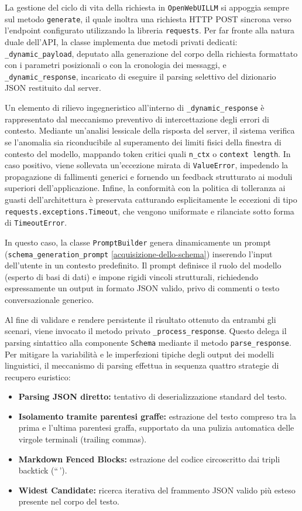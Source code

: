 La gestione del ciclo di vita della richiesta in \texttt{OpenWebUILLM}
si appoggia sempre sul metodo \texttt{generate}, il quale inoltra una
richiesta HTTP POST sincrona verso l'endpoint configurato utilizzando la
libreria \texttt{requests}. Per far fronte alla natura duale dell'API,
la classe implementa due metodi privati dedicati:
\texttt{\_dynamic\_payload}, deputato alla generazione del corpo della
richiesta formattato con i parametri posizionali o con la cronologia dei
messaggi, e \texttt{\_dynamic\_response}, incaricato di eseguire il
parsing selettivo del dizionario JSON restituito dal server.

Un elemento di rilievo ingegneristico all'interno di
\texttt{\_dynamic\_response} è rappresentato dal meccanismo preventivo
di intercettazione degli errori di contesto. Mediante un'analisi
lessicale della risposta del server, il sistema verifica se l'anomalia
sia riconducibile al superamento dei limiti fisici della finestra di
contesto del modello, mappando token critici quali \texttt{n\_ctx} o
\texttt{context\ length}. In caso positivo, viene sollevata un'eccezione
mirata di \texttt{ValueError}, impedendo la propagazione di fallimenti
generici e fornendo un feedback strutturato ai moduli superiori
dell'applicazione. Infine, la conformità con la politica di tolleranza
ai guasti dell'architettura è preservata catturando esplicitamente le
eccezioni di tipo \texttt{requests.exceptions.Timeout}, che vengono
uniformate e rilanciate sotto forma di \texttt{TimeoutError}.

In questo caso, la classe \texttt{PromptBuilder} genera dinamicamente un
prompt (\texttt{schema\_generation\_prompt} \ref{acquisizione-dello-schema}) inserendo l'input
dell'utente in un contesto predefinito. Il prompt definisce il ruolo del
modello (esperto di basi di dati) e impone rigidi vincoli strutturali,
richiedendo espressamente un output in formato JSON valido, privo di
commenti o testo conversazionale generico.

Al fine di validare e rendere persistente il risultato ottenuto da
entrambi gli scenari, viene invocato il metodo privato
\texttt{\_process\_response}. Questo delega il parsing sintattico alla
componente \texttt{Schema} mediante il metodo \texttt{parse\_response}.
Per mitigare la variabilità e le imperfezioni tipiche degli output dei
modelli linguistici, il meccanismo di parsing effettua in sequenza
quattro strategie di recupero euristico:

\begin{itemize}
\item
  \textbf{Parsing JSON diretto:} tentativo di deserializzazione standard
  del testo.
\item
  \textbf{Isolamento tramite parentesi graffe:} estrazione del testo
  compreso tra la prima e l'ultima parentesi graffa, supportato da una
  pulizia automatica delle virgole terminali (trailing commas).
\item
  \textbf{Markdown Fenced Blocks:} estrazione del codice circoscritto
  dai tripli backtick (``\,').
\item
  \textbf{Widest Candidate:} ricerca iterativa del frammento JSON valido
  più esteso presente nel corpo del testo.
\end{itemize}

